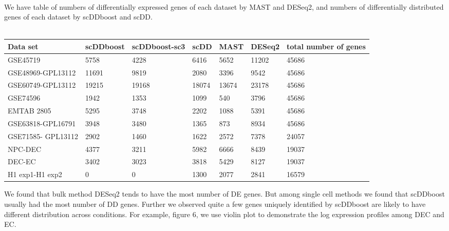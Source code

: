 \documentclass[11pt]{amsart}
\begin{document}
\hfill\\
We have table of numbers of differentially expressed genes of each dataset by MAST and DESeq2, and numbers of differentially distributed genes of each dataset by scDDboost and scDD.\\
\\
\begin{center}
\begin{tabular}{ |p{2cm}|p{2cm}|p{2cm}|p{2cm}|p{2cm}|p{2cm}|p{2cm}|}
\hline
Data set & scDDboost & scDDboost-sc3 & scDD & MAST & DESeq2 & total number of genes\\
\hline
\hline
GSE45719 & 5758 & 4228 & 6416 &5652 & 11202 & 45686\\
\hline
GSE48969-GPL13112 & 11691 & 9819 & 2080 & 3396 & 9542 & 45686\\
\hline
GSE60749-GPL13112 & 19215 & 19168 &  18074 & 13674 & 23178 & 45686\\
\hline
GSE74596 & 1942 & 1353 & 1099 & 540 & 3796 & 45686\\
\hline
EMTAB 2805 & 5295 & 3748 & 2202 & 1088 & 5391 & 45686\\
\hline
GSE63818-GPL16791 & 3948 & 3480 & 1365 & 873 & 8934 & 45686\\
\hline
GSE71585- GPL13112 & 2902 & 1460 & 1622 & 2572 & 7378 & 24057 \\
\hline
NPC-DEC & 4377 & 3211 & 5982 & 6666 & 8439 & 19037\\
\hline
DEC-EC & 3402 & 3023 & 3818 & 5429 & 8127 & 19037\\
\hline
H1 exp1-H1 exp2 &  0 & 0 & 1300 & 2077 & 2841 & 16579\\
\hline
\end{tabular}
\end{center}
We found that bulk method DESeq2 tends to have the most number of DE genes. But among single cell methods we found that scDDboost usually had the most number of DD genes. Further we observed quite a few genes uniquely identified by scDDboost are likely to have different distribution across conditions. For example, figure 6, we use violin plot to demonstrate the log expression profiles among DEC and EC. \\
\end{document}

